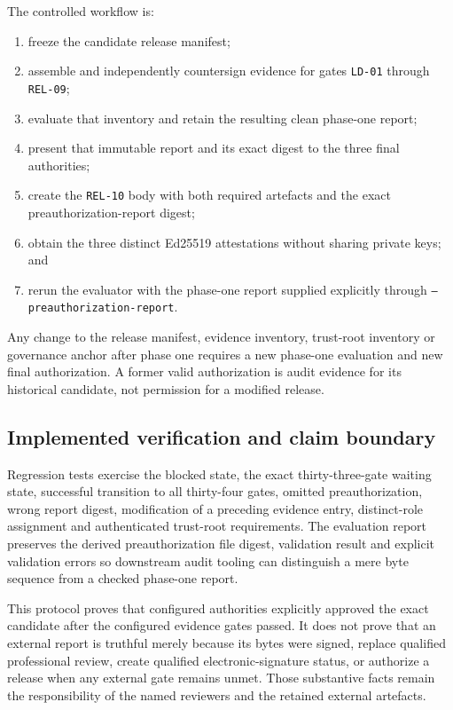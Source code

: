 The controlled workflow is:

\begin{enumerate}
  \item freeze the candidate release manifest;
  \item assemble and independently countersign evidence for gates
        \texttt{LD-01} through \texttt{REL-09};
  \item evaluate that inventory and retain the resulting clean phase-one report;
  \item present that immutable report and its exact digest to the three final
        authorities;
  \item create the \texttt{REL-10} body with both required artefacts and the exact
        preauthorization-report digest;
  \item obtain the three distinct Ed25519 attestations without sharing private
        keys; and
  \item rerun the evaluator with the phase-one report supplied explicitly through
        \texttt{--preauthorization-report}.
\end{enumerate}

Any change to the release manifest, evidence inventory, trust-root inventory or
governance anchor after phase one requires a new phase-one evaluation and new final
authorization.  A former valid authorization is audit evidence for its historical
candidate, not permission for a modified release.

\subsection{Implemented verification and claim boundary}

Regression tests exercise the blocked state, the exact thirty-three-gate waiting
state, successful transition to all thirty-four gates, omitted preauthorization,
wrong report digest, modification of a preceding evidence entry, distinct-role
assignment and authenticated trust-root requirements.  The evaluation report
preserves the derived preauthorization file digest, validation result and explicit
validation errors so downstream audit tooling can distinguish a mere byte sequence
from a checked phase-one report.

This protocol proves that configured authorities explicitly approved the exact
candidate after the configured evidence gates passed.  It does not prove that an
external report is truthful merely because its bytes were signed, replace qualified
professional review, create qualified electronic-signature status, or authorize a
release when any external gate remains unmet.  Those substantive facts remain the
responsibility of the named reviewers and the retained external artefacts.
